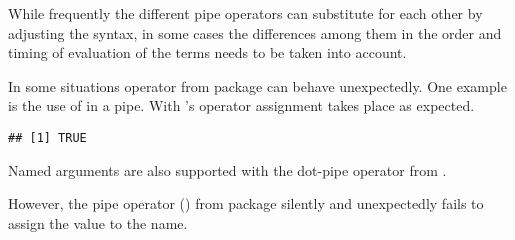 \documentclass[krantz2]{krantz}\usepackage{knitr}
\begin{document}
While frequently the different pipe operators can substitute for each other by adjusting the syntax, in some cases the differences among them in the order and timing of evaluation of the terms needs to be taken into account.

\begin{warningbox}
In some situations operator \Roperator{\%>\%} from package  can behave unexpectedly. One example is the use of  in a pipe. With \Rlang's operator \Roperator{\textbar >} assignment takes place as expected.



\begin{knitrout}\footnotesize
{}\color{fgcolor}\begin{kframe}
\begin{alltt}
 \hlstd{(} \hlstd{=} \hlstd{,}  \hlstd{= _)}
\end{alltt}
\begin{verbatim}
## [1] TRUE
\end{verbatim}
\end{kframe}
\end{knitrout}

Named arguments are also supported with the dot-pipe operator from .

\begin{knitrout}\footnotesize
{}\color{fgcolor}
\end{knitrout}

However, the pipe operator (\Roperator{\%>\%}) from package  silently and unexpectedly fails to assign the value to the name.


\end{warningbox}
\end{document}
